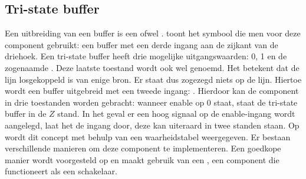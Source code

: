 \subsection{Tri-state buffer}
Een uitbreiding van een buffer is een  ofwel .  toont het symbool die men voor deze component gebruikt: een buffer met een derde ingang aan de zijkant van de driehoek. Een tri-state buffer heeft drie mogelijke uitgangswaarden: 0, 1 en de zogenaamde . Deze laatste toestand wordt ook wel  genoemd. Het betekent dat de lijn losgekoppeld is van enige bron. Er staat dus zogezegd niets op de lijn. Hiertoe wordt een buffer uitgebreid met een tweede ingang: . Hierdoor kan de component in drie toestanden worden gebracht: wanneer enable op 0 staat, staat de tri-state buffer in de $Z$ stand. In het geval er een hoog signaal op de enable-ingang wordt aangelegd, laat het de ingang door, deze kan uiteraard in twee standen staan. Op  wordt dit concept met behulp van een waarheidstabel weergegeven. Er bestaan verschillende manieren om deze component te implementeren. Een goedkope manier wordt voorgesteld op  en maakt gebruik van een , een component die functioneert als een schakelaar.
